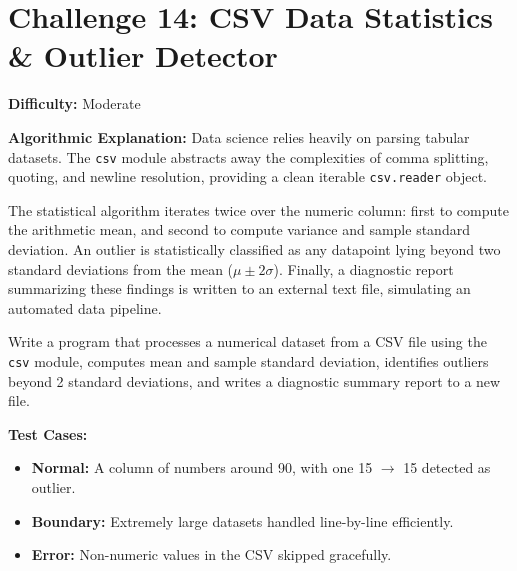 \section{Challenge 14: CSV Data Statistics \& Outlier Detector}

\textbf{Difficulty:} Moderate

\textbf{Algorithmic Explanation:}
Data science relies heavily on parsing tabular datasets. The \texttt{csv} module abstracts away the complexities of comma splitting, quoting, and newline resolution, providing a clean iterable \texttt{csv.reader} object.

The statistical algorithm iterates twice over the numeric column: first to compute the arithmetic mean, and second to compute variance and sample standard deviation. An outlier is statistically classified as any datapoint lying beyond two standard deviations from the mean ($\mu \pm 2\sigma$). Finally, a diagnostic report summarizing these findings is written to an external text file, simulating an automated data pipeline.

\begin{practiceset}
Write a program that processes a numerical dataset from a CSV file using the \texttt{csv} module, computes mean and sample standard deviation, identifies outliers beyond 2 standard deviations, and writes a diagnostic summary report to a new file.

\textbf{Test Cases:}
\begin{itemize}
    \item \textbf{Normal:} A column of numbers around 90, with one 15 $\rightarrow$ 15 detected as outlier.
    \item \textbf{Boundary:} Extremely large datasets handled line-by-line efficiently.
    \item \textbf{Error:} Non-numeric values in the CSV skipped gracefully.
\end{itemize}
\end{practiceset}

